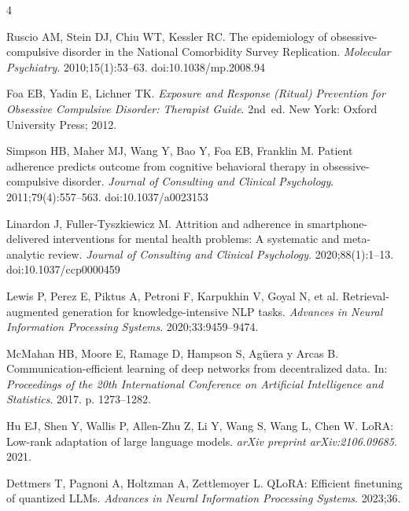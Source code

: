 \documentclass[preprint,12pt,a4paper]{elsarticle}
\begin{document}
\FloatBarrier
\begin{thebibliography}{4}

Ruscio AM, Stein DJ, Chiu WT, Kessler RC.
The epidemiology of obsessive-compulsive disorder in the National Comorbidity Survey Replication.
\textit{Molecular Psychiatry}. 2010;15(1):53--63.
\newblock doi:10.1038/mp.2008.94

Foa EB, Yadin E, Lichner TK.
\textit{Exposure and Response (Ritual) Prevention for Obsessive Compulsive Disorder: Therapist Guide}.
2nd~ed. New York: Oxford University Press; 2012.

Simpson HB, Maher MJ, Wang Y, Bao Y, Foa EB, Franklin M.
Patient adherence predicts outcome from cognitive behavioral therapy in obsessive-compulsive disorder.
\textit{Journal of Consulting and Clinical Psychology}. 2011;79(4):557--563.
\newblock doi:10.1037/a0023153

Linardon J, Fuller-Tyszkiewicz M.
Attrition and adherence in smartphone-delivered interventions for mental health problems: A systematic and meta-analytic review.
\textit{Journal of Consulting and Clinical Psychology}. 2020;88(1):1--13.
\newblock doi:10.1037/ccp0000459

Lewis P, Perez E, Piktus A, Petroni F, Karpukhin V, Goyal N, et al.
Retrieval-augmented generation for knowledge-intensive NLP tasks.
\textit{Advances in Neural Information Processing Systems}. 2020;33:9459--9474.

McMahan HB, Moore E, Ramage D, Hampson S, Ag{\"u}era y Arcas B.
Communication-efficient learning of deep networks from decentralized data.
In: \textit{Proceedings of the 20th International Conference on Artificial Intelligence and Statistics}. 2017. p. 1273--1282.

Hu EJ, Shen Y, Wallis P, Allen-Zhu Z, Li Y, Wang S, Wang L, Chen W.
LoRA: Low-rank adaptation of large language models.
\textit{arXiv preprint arXiv:2106.09685}. 2021.

Dettmers T, Pagnoni A, Holtzman A, Zettlemoyer L.
QLoRA: Efficient finetuning of quantized LLMs.
\textit{Advances in Neural Information Processing Systems}. 2023;36.

\end{thebibliography}
\end{document}
